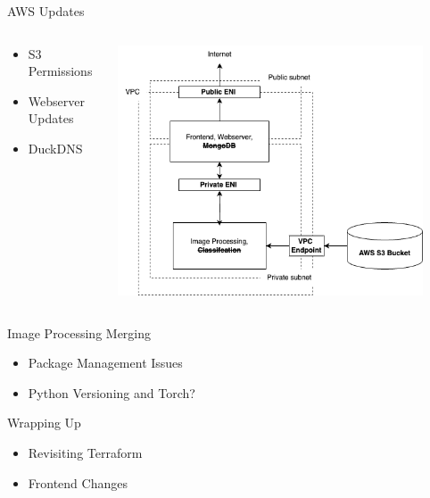
\begin{frame}{AWS Updates}
    \begin{columns}
        \begin{column}{0.3\textwidth}
            \begin{itemize}
                \item S3 Permissions
                \item Webserver Updates
                \item DuckDNS
            \end{itemize} 
        \end{column}
        \begin{column}{0.7\textwidth}
            \centering
            \includegraphics[height=0.9\textheight,width=0.9\textwidth,keepaspectratio]{images/mm_8-13-system.png}
        \end{column}
    \end{columns}
\end{frame}

\begin{frame}{Image Processing Merging}
    \begin{itemize}
        \item Package Management Issues
        \item Python Versioning and Torch?
    \end{itemize} 
\end{frame}

\begin{frame}{Wrapping Up}
    \begin{itemize}
        \item Revisiting Terraform
        \item Frontend Changes
    \end{itemize} 
\end{frame}


